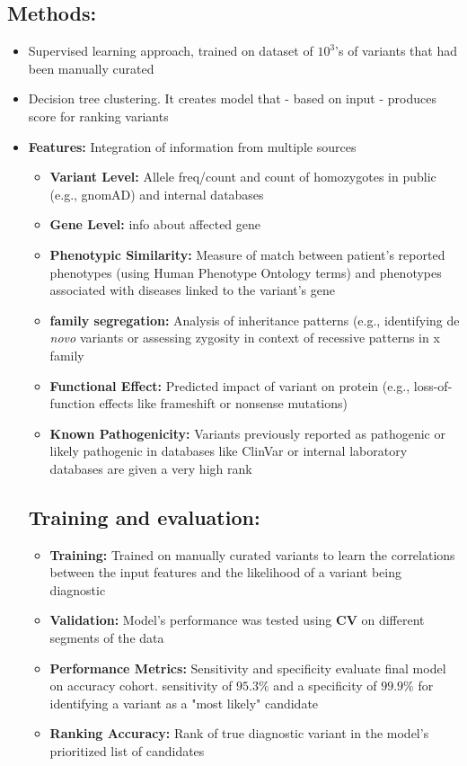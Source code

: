 \documentclass[../main.tex]{subfiles}
\begin{document}
\subsection*{Methods:} 
\begin{itemize}
    \item Supervised learning approach, trained on dataset of $10^3$'s of variants that had been manually curated
    \item Decision tree clustering. It creates model that - based on input - produces score for ranking variants
    \item \textbf{Features:} Integration of information from multiple sources
    \begin{itemize}
        \item \textbf{Variant Level:} Allele freq/count and count of homozygotes in public (e.g., gnomAD) and internal databases
        \item \textbf{Gene Level:} info about affected gene
        \item \textbf{Phenotypic Similarity:} Measure of match between patient's reported phenotypes (using Human Phenotype Ontology terms) and phenotypes associated with diseases linked to the variant's gene
        \item \textbf{family segregation:} Analysis of inheritance patterns (e.g., identifying de \textit{novo} variants or assessing zygosity in context of recessive patterns in x family
        \item \textbf{Functional Effect:} Predicted impact of variant on protein (e.g., loss-of-function effects like frameshift or nonsense mutations)
        \item \textbf{Known Pathogenicity:} Variants previously reported as pathogenic or likely pathogenic in databases like ClinVar or internal laboratory databases are given a very high rank
    \end{itemize}

\hrulefill

\subsection*{Training and evaluation:}
\begin{itemize}
    \item \textbf{Training:} Trained on manually curated variants to learn the correlations between the input features and the likelihood of a variant being diagnostic
    \item \textbf{Validation:} Model's performance was tested using \textbf{CV} on different segments of the data
    \item \textbf{Performance Metrics:} Sensitivity and specificity evaluate final model on accuracy cohort. sensitivity of $95.3\%$ and a specificity of $99.9\%$ for identifying a variant as a "most likely" candidate
    \item \textbf{Ranking Accuracy:} Rank of true diagnostic variant in the model's prioritized list of candidates
\end{itemize}
\end{itemize}
\end{document}
